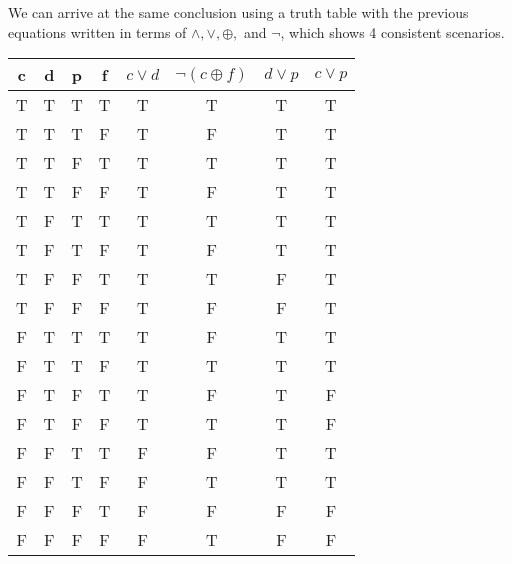 \documentclass{article}
\newcommand*\xor{\oplus}
\begin{document}
\begin{enumerate}
\begin{enumerate}
		            We can arrive at the same conclusion using a truth
		            table with the previous equations written in terms of
		            $\land, \lor, \xor, $ and $\lnot$, which shows 4
		            consistent scenarios.

		            \begin{tabular}{|c|c|c|c||c|c|c|c|}
			            \hline
			            c                   & d & p & f & $c \lor d$ & $\lnot(c\xor f)$ & $d \lor p$ & $c \lor p$ \\
			            \hline
			            \rowcolor{yellow} T & T & T & T & T          & T                & T          & T          \\
			            T                   & T & T & F & T          & F                & T          & T          \\
			            \rowcolor{yellow} T & T & F & T & T          & T                & T          & T          \\
			            T                   & T & F & F & T          & F                & T          & T          \\
			            \rowcolor{yellow}T  & F & T & T & T          & T                & T          & T          \\
			            T                   & F & T & F & T          & F                & T          & T          \\
			            T                   & F & F & T & T          & T                & F          & T          \\
			            T                   & F & F & F & T          & F                & F          & T          \\
			            F                   & T & T & T & T          & F                & T          & T          \\
			            \rowcolor{yellow}F  & T & T & F & T          & T                & T          & T          \\
			            F                   & T & F & T & T          & F                & T          & F          \\
			            F                   & T & F & F & T          & T                & T          & F          \\
			            F                   & F & T & T & F          & F                & T          & T          \\
			            F                   & F & T & F & F          & T                & T          & T          \\
			            F                   & F & F & T & F          & F                & F          & F          \\
			            F                   & F & F & F & F          & T                & F          & F          \\
			            \hline
		            \end{tabular}


\end{enumerate}
\end{enumerate}
\end{document}
